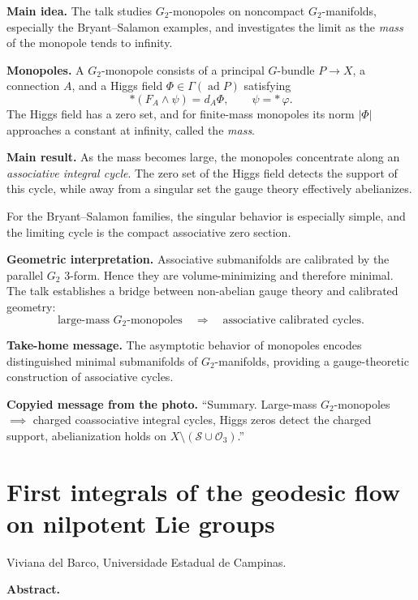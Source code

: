 \medskip\noindent
\textbf{Main idea.}
The talk studies $G_2$-monopoles on noncompact
$G_2$-manifolds, especially the Bryant--Salamon
examples, and investigates the limit as the
\emph{mass} of the monopole tends to infinity.

\medskip\noindent
\textbf{Monopoles.}
A $G_2$-monopole consists of a principal
$G$-bundle $P \to X$, a connection $A$, and
a Higgs field $\Phi \in \Gamma(\operatorname{ad}P)$
satisfying
\[
*(F_A \wedge \psi)=d_A\Phi,
\qquad \psi=*\,\varphi.
\]
The Higgs field has a zero set, and for
finite-mass monopoles its norm $|\Phi|$
approaches a constant at infinity, called
the \emph{mass}.

\medskip\noindent
\textbf{Main result.}
As the mass becomes large, the monopoles
concentrate along an \emph{associative integral
cycle}. The zero set of the Higgs field detects the
support of this cycle, while away from a singular
set the gauge theory effectively abelianizes.

For the Bryant--Salamon families, the singular
behavior is especially simple, and the limiting
cycle is the compact associative zero section.


\medskip\noindent
\textbf{Geometric interpretation.}
Associative submanifolds are calibrated by the
parallel $G_2$ $3$-form. Hence they are
volume-minimizing and therefore minimal.
The talk establishes a bridge between
non-abelian gauge theory and calibrated
geometry:
\[
\text{large-mass } G_2\text{-monopoles}
\quad\Longrightarrow\quad
\text{associative calibrated cycles}.
\]

\medskip\noindent
\textbf{Take-home message.}
The asymptotic behavior of monopoles encodes
distinguished minimal submanifolds of
$G_2$-manifolds, providing a gauge-theoretic
construction of associative cycles.

\medskip\noindent
{\bf Copyied message from the photo.} 
``Summary. Large-mass $G_2$-monopoles
$\implies $ charged coassociative
integral cycles, Higgs zeros
detect the charged support,
abelianization holds on
$X\setminus (\mathcal{S} \cup  
\mathcal{O}_3)$.''

\section{First integrals of the geodesic
flow on nilpotent Lie groups}
\label{section-first-integrals-geodesic-flow}

\medskip\noindent
Viviana del Barco,
Universidade Estadual de Campinas.

\medskip\noindent
{\bf Abstract.}

